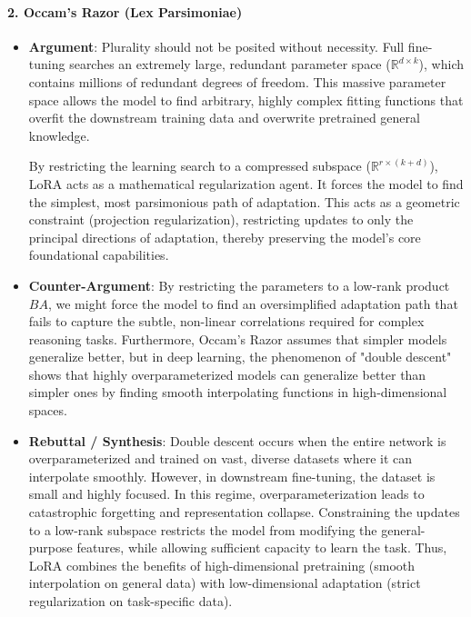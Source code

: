 \documentclass{article}
\begin{document}
\paragraph{2. Occam's Razor (Lex Parsimoniae)}
\begin{itemize}
  \item \textbf{Argument}: Plurality should not be posited without necessity. Full fine-tuning searches an extremely large, redundant parameter space ($\mathbb{R}^{d \times k}$), which contains millions of redundant degrees of freedom. This massive parameter space allows the model to find arbitrary, highly complex fitting functions that overfit the downstream training data and overwrite pretrained general knowledge.
  
  By restricting the learning search to a compressed subspace ($\mathbb{R}^{r \times (k+d)}$), LoRA acts as a mathematical regularization agent. It forces the model to find the simplest, most parsimonious path of adaptation. This acts as a geometric constraint (projection regularization), restricting updates to only the principal directions of adaptation, thereby preserving the model's core foundational capabilities.
  
  \item \textbf{Counter-Argument}: By restricting the parameters to a low-rank product $BA$, we might force the model to find an oversimplified adaptation path that fails to capture the subtle, non-linear correlations required for complex reasoning tasks. Furthermore, Occam's Razor assumes that simpler models generalize better, but in deep learning, the phenomenon of "double descent" shows that highly overparameterized models can generalize better than simpler ones by finding smooth interpolating functions in high-dimensional spaces.
  
  \item \textbf{Rebuttal / Synthesis}: Double descent occurs when the entire network is overparameterized and trained on vast, diverse datasets where it can interpolate smoothly. However, in downstream fine-tuning, the dataset is small and highly focused. In this regime, overparameterization leads to catastrophic forgetting and representation collapse. Constraining the updates to a low-rank subspace restricts the model from modifying the general-purpose features, while allowing sufficient capacity to learn the task. Thus, LoRA combines the benefits of high-dimensional pretraining (smooth interpolation on general data) with low-dimensional adaptation (strict regularization on task-specific data).
\end{itemize}
\end{document}
